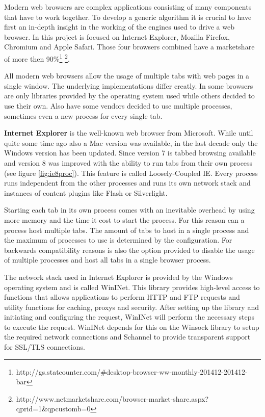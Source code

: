 

Modern web browsers are complex applications consisting of many components that have to work together. To develop a generic algorithm it is crucial to have first an in-depth insight in the working of the engines used to drive a web browser. In this project is focused on Internet Explorer, Mozilla Firefox, Chromium and Apple Safari. Those four browsers combined have a marketshare of more then 90\%\footnote{http://gs.statcounter.com/\#desktop-browser-ww-monthly-201412-201412-bar} \footnote{http://www.netmarketshare.com/browser-market-share.aspx?qprid=1\&qpcustomb=0}.

All modern web browsers allow the usage of multiple tabs with web pages in a single window. The underlying implementations differ creatly. In some browsers are only libraries provided by the operating system used while others decided to use their own. Also have some vendors decided to use multiple processes, sometimes even a new process for every single tab.

\textbf{Internet Explorer} is the well-known web browser from Microsoft. While until quite some time ago also a Mac version was available, in the last decade only the Windows version has been updated. Since version 7 is tabbed browsing available and version 8 was improved with the ability to run tabs from their own process (see figure \ref{fig:ie8proc}). This feature is called Loosely-Coupled IE\cite{IE8LCIE}. Every process runs independent from the other processes and runs its own network stack and instances of content plugins like Flash or Silverlight.

Starting each tab in its own process comes with an inevitable overhead by using more memory and the time it cost to start the process. For this reason can a process host multiple tabs. The amount of tabs to host in a single process and the maximum of processes to use is determined by the configuration. For backwards compatibility reasons is also the option provided to disable the usage of multiple processes and host all tabs in a single browser process.

\label{sec:brie}
The network stack used in Internet Explorer is provided by the Windows operating system and is called WinINet. This library provides high-level access to functions that allows applications to perform HTTP and FTP requests and utility functions for caching, proxys and security. After setting up the library and initiating and configuring the request, WinINet will perform the necessary steps to execute the request. WinINet depends for this on the Winsock library to setup the required network connections and Schannel \cite{schannel} to provide transparent support for SSL/TLS connections.

